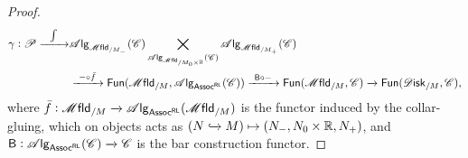 \documentclass[../text]{subfiles}
\begin{document}
\begin{proof}
    \begin{align}
        \gamma: \mathscr{P} \xrightarrow{\ \ \int \ \ } &\alg{\mfld_{/M_-}}(\catC) \bigtimes\limits_{\alg{\mfld_{/M_0 \times \mathbb{R}}} (\catC)} \alg{\mfld_{/M_+}} (\catC)\notag\\ &\xrightarrow{\ - \circ \bar{f} \ } \mathsf{Fun}(\mfld_{/M}, \alg{\mathsf{Assoc^{RL}}} (\catC)) \xrightarrow{\ \mathsf{B} \circ - \ } \mathsf{Fun}(\mfld_{/M},\catC) \xrightarrow{\ } \mathsf{Fun}(\disk_{/M}, \catC),
    \end{align}
    where $\bar{f}: \mfld_{/M} \xrightarrow{} \alg{\mathsf{Assoc^{RL}}} (\mfld_{/M})$ is the functor induced by the collar-gluing, which on objects acts as $(N \xhookrightarrow{} M) \mapsto (N_-, N_0 \times \mathbb{R}, N_+)$, and $\mathsf{B}: \mathscr{A} \mathsf{lg}_{\mathsf{Assoc^{RL}}} (\mathscr{C}) \xrightarrow{} \mathscr{C}$ is the bar construction functor.
    

\end{proof}
\end{document}
